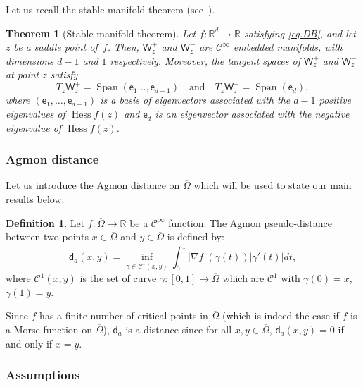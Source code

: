 \documentclass[10pt]{amsart}
\newcommand{\quand}{\quad\text{and}\quad}
\DeclareMathOperator{\Span}{Span}
\DeclareMathOperator{\hess}{Hess}\let\Hess\hess
\theoremstyle{plain}
\newtheorem*{theorem*}{Theorem}
\theoremstyle{definition}
\newtheorem{definition}[proposition]{Definition}
\begin{document}
Let us recall the stable manifold theorem (see~\cite[Cor.\,6.4.1]{jost2008riemannian}).

\begin{theorem*}[Stable manifold theorem]
Let $f: \mathbb R^d\to \mathbb R$ satisfying \eqref{eq.DB}, and let $z$
be a saddle point of~$f$. Then, $\mathsf W_z^+ $ and $\mathsf
W_z^- $ are $\mathcal C^\infty$ embedded manifolds, with
dimensions $d-1$ and $1$ respectively.
Moreover, the tangent spaces of $\mathsf W_z^+ $ and $\mathsf
W_z^- $ at point $z$ satisfy
\[
T_z\mathsf W_z^+ =\Span (\mathsf e_1\ldots,\mathsf e_{d-1})
\quand T_z \mathsf W_z^- = \Span(\mathsf e_d),
\]
where $(\mathsf e_1,\ldots,\mathsf e_{d-1})$ is a basis of eigenvectors associated with the $d-1$ positive eigenvalues of $\hess f(z)$ and $\mathsf e_d$ is an eigenvector associated with the negative eigenvalue of $\hess f(z)$.
\end{theorem*}

\subsubsection*{Agmon distance} Let us introduce the Agmon distance on $\overline \Omega$ which will be used to state our main results below.


\begin{definition} \label{de.da} Let $f:\overline \Omega\to \mathbb R$ be a $\mathcal C^\infty$ function.
The Agmon pseudo-distance between two points $x\in \overline \Omega$ and $y \in \overline \Omega$ is defined by:
\[
\mathsf d_a\left(x,y\right)=\inf _{\gamma\in \mathcal C^1(x,y)} \int_0^1\vert \nabla f\vert (\gamma(t)) \left\vert \gamma'(t) \right\vert dt,
\]
where $\mathcal C^1\left(x,y\right)$ is the set of curve $\gamma:[0,1] \to \overline \Omega$ which are $\mathcal C^1$ with $\gamma(0)=x$, $\gamma(1)=y$.
\end{definition}
Since $f$ has a finite number of critical points in
$\overline \Omega$ (which is indeed the case if $f$ is a Morse function on
$\overline \Omega$), $\mathsf d_a$ is a distance since for all $x,y\in
\overline \Omega$, $\mathsf d_a(x,y)=0$ if and only if $x=y$.

\subsubsection{Assumptions}
\end{document}
